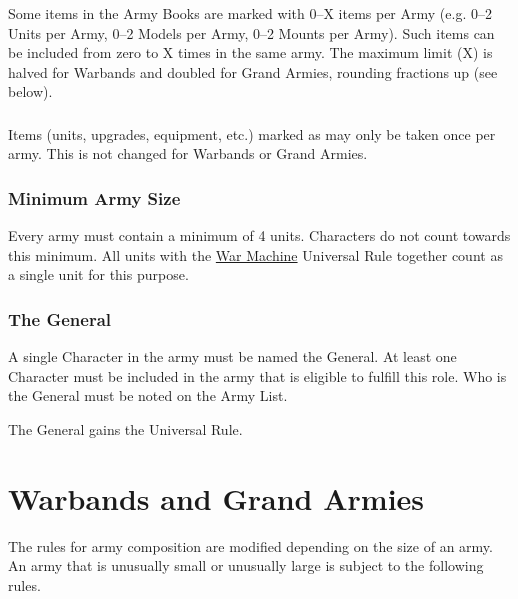 Some items in the Army Books are marked with 0--X items per Army (e.g. 0--2 Units per Army, 0--2 Models per Army, 0--2 Mounts per Army). Such items can be included from zero to X times in the same army. The maximum limit (X) is halved for Warbands and doubled for Grand Armies, rounding fractions up (see below).

\subsubsection{\oneofakind}

Items (units, upgrades, equipment, etc.) marked as \oneofakind{} may only be taken once per army. This is not changed for Warbands or Grand Armies.

\subsubsection{Minimum Army Size}

Every army must contain a minimum of 4 units. Characters do not count towards this minimum. All units with the \hyperref[war_machine]{War Machine} Universal Rule together count as a single unit for this purpose.

\subsubsection{The General}
\label{the_general}

A single Character in the army must be named the General. At least one Character must be included in the army that is eligible to fulfill this role. Who is the General must be noted on the Army List.

The General gains the \hyperref[commanding_presence]{\commandingpresence} Universal Rule.

\newpage
\section{Warbands and Grand Armies}
\label{warbands_and_grand_armies}

The rules for army composition are modified depending on the size of an army. An army that is unusually small or unusually large is subject to the following rules.

